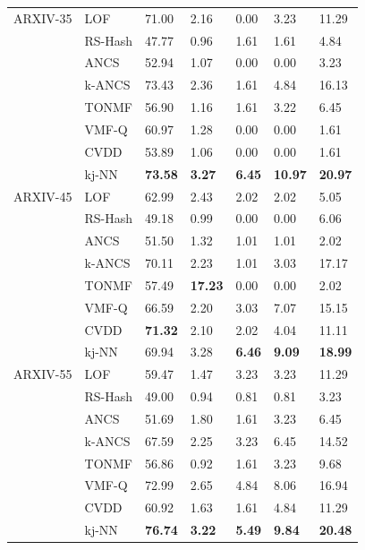 \begin{table}
\begin{tabularx}{\columnwidth}{@{}XXXXXXX@{}}
ARXIV-35 & \gls{LOF}     & 71.00 &	2.16 &	0.00 &	3.23 &	11.29 \\
         & \gls{RS-Hash} & 47.77 & 0.96  & 1.61  & 1.61  & 4.84  \\
         & \gls{ANCS}     & 52.94 & 1.07  & 0.00  & 0.00  & 3.23  \\
         & \gls{k-ANCS}   & 73.43 &	2.36 &	1.61 &	4.84 &	16.13 \\
         & \gls{TONMF}   & 56.90 & 1.16  & 1.61  & 3.22  & 6.45      \\
         & \gls{VMF-Q}   & 60.97 & 1.28  & 0.00  & 0.00  & 1.61  \\
         & \gls{CVDD}     & 53.89 &	1.06 &	0.00 &	0.00 &	1.61 \\
         & \gls{kj-NN}   & \bfseries73.58 &\bfseries	3.27 &\bfseries	6.45 &\bfseries	10.97 &\bfseries	20.97 	 \\ \midrule

ARXIV-45 & \gls{LOF}     & 62.99 	& 2.43 	& 2.02 	& 2.02 & 5.05  \\
         & \gls{RS-Hash} & 49.18 & 0.99  & 0.00  & 0.00  & 6.06  \\
         & \gls{ANCS}     & 51.50 & 1.32  & 1.01  & 1.01  & 2.02  \\
         & \gls{k-ANCS}   & 70.11 & 2.23  & 1.01  & 3.03  & 17.17 \\
         & \gls{TONMF}   & 57.49   & \bfseries17.23 & 0.00 	 & 0.00  & 2.02 \\
         & \gls{VMF-Q}   & 66.59 & 2.20  & 3.03  & 7.07  & 15.15 \\
         & \gls{CVDD}     & \bfseries71.32 &	2.10 &	2.02 &	4.04 &	11.11  \\
         & \gls{kj-NN}   & 69.94 &	3.28 &\bfseries	6.46&\bfseries 	9.09 &\bfseries	18.99 \\ \midrule

ARXIV-55 & \gls{LOF}     & 59.47 	& 1.47 	& 3.23 & 	3.23 &	11.29 \\
         & \gls{RS-Hash} & 49.00 & 0.94  & 0.81  & 0.81  & 3.23  \\
         & \gls{ANCS}     & 51.69 & 1.80  & 1.61  & 3.23  & 6.45  \\
         & \gls{k-ANCS}   & 67.59 &	2.25 &	3.23 &	6.45 &	14.52 	 \\
         & \gls{TONMF}   & 56.86 & 0.92  & 1.61  & 3.23  & 9.68    \\
         & \gls{VMF-Q}   & 72.99 & 2.65  & 4.84  & 8.06  & 16.94 \\
         & \gls{CVDD}     & 60.92	& 1.63	& 1.61	& 4.84	& 11.29  \\
         & \gls{kj-NN}   & \bfseries76.74 & \bfseries	3.22 & \bfseries	5.49 & \bfseries	9.84 & \bfseries	20.48 \\ \midrule


\end{tabularx}
\end{table}

